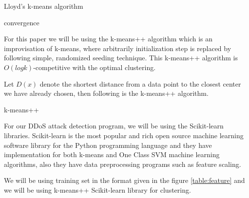 \documentclass[12pt,oneside,a4paper]{article}
\begin{document}
\begin{algorithm}
\caption{Lloyd's k-means algorithm}\label{k-means}
\begin{algorithmic}
\Repeat
  \EndFor
  \EndFor
\Until convergence
\end{algorithmic}
\end{algorithm}

For this paper we will be using the k-means++ algorithm\cite{k-means++} which is an improvisation of k-means, where arbitrarily initialization step is replaced by following simple, randomized seeding technique. This k-means++ algorithm is $O(log k)$-competitive with the optimal clustering.

Let $D(x)$ denote the shortest distance from a data point to the closest center we have already chosen, then following is the k-means++ algorithm.

\begin{algorithm}
\caption{k-means++}\label{k-means++}
\begin{algorithmic}[1]
\end{algorithmic}
\end{algorithm}

For our DDoS attack detection program, we will be using the Scikit-learn libraries. Scikit-learn is the most popular and rich open source machine learning software library for the Python programming language and they have implementation for both k-means and One Class SVM machine learning algorithms, also they have data preprocessing programs such as feature scaling.

We will be using training set in the format given in the figure \ref{table:feature} and we will be using k-means++ Scikit-learn library for clustering.
\end{document}
